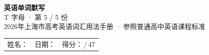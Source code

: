 \documentclass[10pt,a4paper]{article}
\begin{document}
\pagestyle{plain}

\begin{center}
{\LARGE\bfseries 英语单词默写}\\[0.22em]
{\large T 字母 · 第 5 / 5 份}\\[0.18em]
{\small 2026年上海市高考英语词汇用法手册 · 参照普通高中英语课程标准}
\end{center}

\vspace{0.25em}
\noindent\begin{tabular}{@{}p{}@{}p{}@{}p{}@{}}
姓名：\underline{\hspace{2.0cm}} & 日期：\underline{\hspace{2.0cm}} & 得分：\underline{\hspace{1.3cm}}\,/\,47 \\
\end{tabular}

\vspace{0.3em}

\vspace{0.08em}
\end{document}
